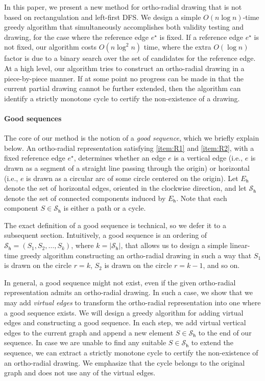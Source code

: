 \documentclass{theoretics}
\newcommand{\EH}{E_\mathsf{h}}
\newcommand{\PH}{\mathcal{S}_\mathsf{h}}
\newcommand{\eref}{e^\star}
\begin{document}
In this paper, we present a new method for ortho-radial drawing that is not based on rectangulation and left-first DFS. 
We design a simple $O(n \log n)$-time greedy algorithm that simultaneously accomplishes both validity testing and drawing, for the case where the reference edge $\eref$ is fixed. If a reference edge $\eref$ is not fixed, our algorithm costs $O(n \log^2 n)$ time, where the extra $O(\log n)$ factor is due to a binary search over the set of  candidates for the reference edge.
 At a high level, our algorithm tries to construct an ortho-radial drawing in a piece-by-piece manner. If at some point no progress can be made in that the current partial drawing cannot be further extended, then the algorithm can identify a strictly monotone cycle to certify the non-existence of a drawing. 
 
 \paragraph{Good sequences} The core of our method is the notion of a \emph{good sequence}, which we briefly explain below. An ortho-radial representation satisfying \ref{item:R1} and \ref{item:R2}, with a fixed reference edge $\eref$, determines whether an edge $e$ is a vertical edge (i.e., $e$ is drawn as a  segment of  a straight line passing through the origin) or  horizontal  (i.e., $e$ is drawn as a circular arc of some circle
centered on the origin). Let $\EH$ denote the set of horizontal edges, oriented in the clockwise direction, and let $\PH$ denote the set of connected components induced by $\EH$. Note that each component $S \in \PH$ is either a path or a cycle.

The exact definition of a good sequence is technical, so we defer it to a subsequent section. Intuitively, a good sequence is  an ordering of $\PH=(S_1, S_2, \ldots, S_{k})$, where $k = |\PH|$, that allows us to design
a simple linear-time greedy algorithm constructing an ortho-radial drawing in such a way that $S_1$ is drawn on the circle $r=k$, $S_2$ is drawn on the circle $r = k-1$, and so on. 
 
In general, a good sequence might not exist, even if the given ortho-radial representation admits an ortho-radial drawing. In such a case, we show that we may add \emph{virtual edges} to transform the ortho-radial representation into one where a good sequence exists. 
We will design a greedy algorithm for adding virtual edges and constructing a good sequence. In each step, we add virtual vertical edges to the current graph and append a new element $S \in \PH$ to the end of our sequence. In case we are unable to find any suitable $S \in \PH$ to extend the sequence, we can extract a strictly monotone cycle to certify the non-existence of an ortho-radial drawing. We emphasize that the cycle belongs to the original graph and does not use any of the virtual edges.
\end{document}

